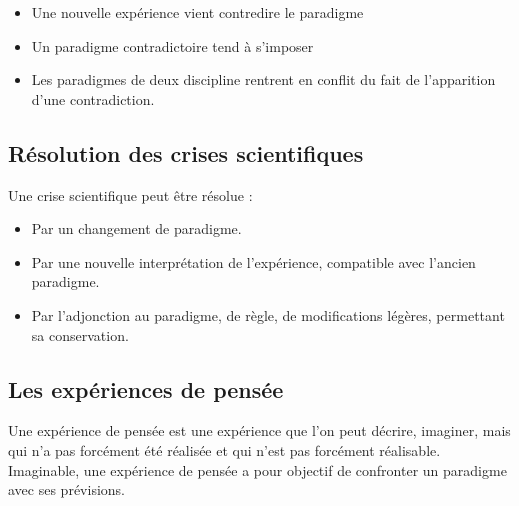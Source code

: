 	\begin{itemize}[leftmargin=1cm, label=, itemsep=1pt]
		\item Une nouvelle expérience vient contredire le paradigme
		\item Un paradigme contradictoire tend à s'imposer
		\item Les paradigmes de deux discipline rentrent en conflit du fait de l'apparition d'une contradiction.
	\end{itemize}

  \subsection{Résolution des crises scientifiques}
Une crise scientifique peut être résolue : 

	\begin{itemize}[leftmargin=1cm, label=, itemsep=1pt]
		\item Par un changement de paradigme.
		\item Par une nouvelle interprétation de l'expérience, compatible avec l'ancien paradigme.
		\item Par l'adjonction au paradigme, de règle, de modifications légères, permettant sa conservation.
	\end{itemize}



  \subsection{Les expériences de pensée}

Une expérience de pensée est une expérience que l'on peut décrire, imaginer, mais qui n'a pas forcément été réalisée et qui n'est pas forcément réalisable. Imaginable, une expérience de pensée a pour objectif de confronter un paradigme avec ses prévisions.







